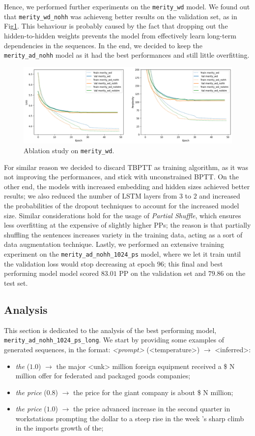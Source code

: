 Hence, we performed further experiments on the \texttt{merity\_wd} model. We found out that \texttt{merity\_wd\_nohh} was achieveng better results on the validation set, as in Fig\ref{fig:tl_merity_wd}. This behaviour is probably caused by the fact that dropping out the hidden-to-hidden weights prevents the model from effectively learn long-term dependencies in the sequences. In the end, we decided to keep the \texttt{merity\_ad\_nohh} model as it had the best performances and still little overfitting.
\begin{figure}
    \centering
    \includegraphics[width=.5\textwidth]{./assets/images/tl_merity_wd}
    \caption{Ablation study on \texttt{merity\_wd}.}
    \label{fig:tl_merity_wd}
\end{figure}

For similar reason we decided to discard TBPTT as training algorithm, as it was not improving the performances, and stick with unconstrained BPTT. On the other end, the models with increased embedding and hidden sizes achieved better results; we also reduced the number of LSTM layers from $3$ to $2$ and increased the probabilities of the dropout techniques to account for the increased model size. Similar considerations hold for the usage of \emph{Partial Shuffle}, which ensures less overfitting at the expensive of slightly higher PPs; the reason is that partially shuffling the sentences increases variety in the training data, acting as a sort of data augmentation technique. Lastly, we performed an extensive training experiment on the \texttt{merity\_ad\_nohh\_1024\_ps} model, where we let it train until the validation loss would stop decreasing at epoch $96$; this final and best performing model model scored $83.01$ PP on the validation set and $79.86$ on the test set.

\subsection{Analysis}
This section is dedicated to the analysis of the best performing model, \texttt{merity\_ad\_nohh\_1024\_ps\_long}. We start by providing some examples of generated sequences, in the format: \emph{<prompt>} (<temperature>) $\rightarrow$ <inferred>:
\begin{itemize}
    \item \emph{the} ($1.0$) $\rightarrow$ the major <unk> million foreign equipment received a \$ N million offer for federated and packaged goods companies;
    \item \emph{the price} ($0.8$) $\rightarrow$ the price for the giant company is about \$ N million;
    \item \emph{the price} ($1.0$) $\rightarrow$ the price advanced increase in the second quarter in workstations prompting the dollar to a steep rise in the week 's sharp climb in the imports growth of the;
\end{itemize}

